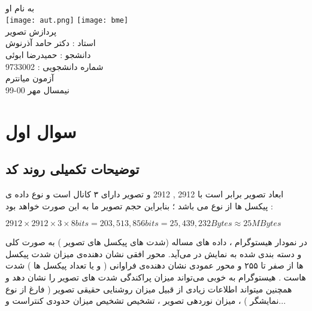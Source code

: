 \documentclass[12pt]{article}
\begin{document}
	\doublespacing
	\begin{titlepage}
		\paragraph*{}
		\centering
			
			
			{\small به نام او}\\
			\vspace{1cm}
			\texttt{[image: aut.png]}
			\hspace{2.5cm}
			\hspace{2.5cm}
			\texttt{[image: bme]}\\
			\vspace{2cm}
			{\Huge پردازش تصویر}\\
			\vspace{2cm}
			{\large استاد : دکتر حامد آذرنوش}\\
			\vspace{0.5cm}
			{\small  دانشجو :‌ حمیدرضا ابوئی}\\
			\vspace{0.5cm}
			{\small شماره دانشجویی : 9733002}\\
			\vspace{0.5cm}
			{\small آزمون میانترم}\\
			\vfill
			{\tiny نیمسال مهر 00-99}
	\end{titlepage}
	\thispagestyle{plain}
	\tableofcontents
	\newpage
	\doublespacing
	\section{سوال اول}
		\subsection{توضیحات تکمیلی روند کد}
			ابعاد تصویر برابر است با 
			2912  ,  2912
			و تصویر 
			دارای ۳ کانال است 
			و نوع داده ی پیکسل ها از نوع
			 می باشد ؛ بنابراین حجم تصویر ما به این صورت خواهد بود :
			 
			 $ 2912 \times 2912 \times 3 \times 8bits = 203,513,856 bits = 25,439,232Bytes \approx 25MBytes  $
			 
			 در نمودار هیستوگرام ، داده های مساله (شدت های پیکسل های تصویر ) به صورت کلی و دسته بندی شده به نمایش در می‌آید. محور افقی نشان دهنده‌ی میزان شدت پیکسل ها از صفر تا ۲۵۵ و محور عمودی نشان دهند‌ه‌ی فراوانی ( و یا تعداد پیکسل ها ) شدت هاست .
			 هیستوگرام به خوبی می‌تواند میزان پراکندگی شدت های تصویر را نشان دهد و همچنین میتواند اطلاعات زیادی از قبیل میزان روشنایی حقیقی تصویر ( فارغ از نوع نمایشگر ) ، میزان نوردهی تصویر ، تشخیص 
			تشخیص میزان حدودی کنتراست و...
			
\end{document}
